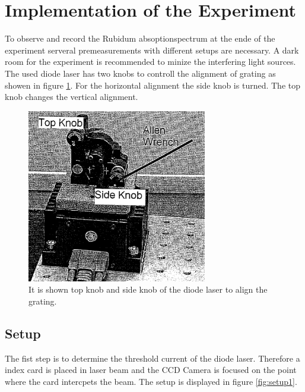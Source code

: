 \section{Implementation of the Experiment}
\label{sec:Durchführung}
To observe and record the Rubidum absoptionspectrum at the ende
of the experiment
serveral premeasurements with different setups are necessary.
A dark room for the experiment is recommended to minize the
interfering light sources.
The used diode laser has two knobs to controll the alignment of grating
as showen in figure \ref{fig:knobs}.
For the horizontal alignment the side knob is turned. The
top knob changes the vertical alignment.
\begin{figure}
  \centering
  \includegraphics[width=0.7\textwidth]{Laserknobs.png}
  \caption{It is shown top knob and side knob of the diode laser to align the grating.\cite{V61}}
  \label{fig:knobs}
\end{figure}


\subsection{Setup}
\label{subsec:setup}
The fist step is to determine the threshold current
of the diode laser.
Therefore a index card is placed in laser beam and the CCD Camera
is focused on the point where the card intercpets the beam.
The setup is displayed
in figure \ref{fig:setup1}.

